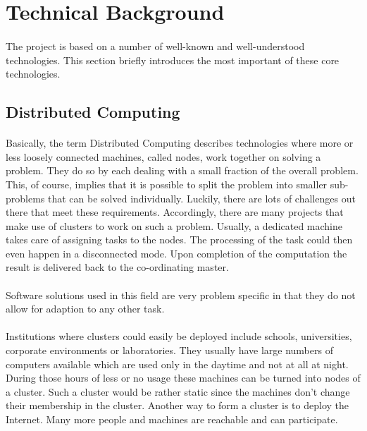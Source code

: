 \section{Technical Background}%
\paragraph{}
The project is based on a number of well-known and well-understood technologies. This section briefly introduces the most important of these core technologies.

\subsection{Distributed Computing}
\paragraph{}
Basically, the term Distributed Computing describes technologies where more or less loosely connected machines, called nodes, work together on solving a problem. They do so by each dealing with a small fraction of the overall problem. This, of course, implies that it is possible to split the problem into smaller sub-problems that can be solved individually. Luckily, there are lots of challenges out there that meet these requirements. Accordingly, there are many projects that make use of clusters to work on such a problem. Usually, a dedicated machine takes care of assigning tasks to the nodes. The processing of the task could then even happen in a disconnected mode. Upon completion of the computation the result is delivered back to the co-ordinating master.

\paragraph{}
Software solutions used in this field are very problem specific in that they do not allow for adaption to any other task.

\paragraph{}
Institutions where clusters could easily be deployed include schools, universities, corporate environments or laboratories. They usually have large numbers of computers available which are used only in the daytime and not at all at night. During those hours of less or no usage these machines can be turned into nodes of a cluster. Such a cluster would be rather static since the machines don't change their membership in the cluster. Another way to form a cluster is to deploy the Internet. Many more people and machines are reachable and can participate.

